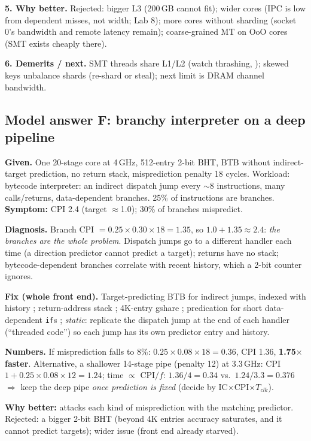 \textbf{5. Why better.} Rejected: bigger L3 (200\,GB cannot fit); wider cores (IPC is low from dependent misses, not width; Lab 8); more cores without sharding (socket 0's bandwidth and remote latency remain); coarse-grained MT on OoO cores (SMT exists cheaply there).

\textbf{6. Demerits / next.} SMT threads share L1/L2 (watch thrashing, ); skewed keys unbalance shards (re-shard or steal); next limit is DRAM channel bandwidth.

\subsection{Model answer F: branchy interpreter on a deep pipeline}\label{sec:modelF}
\textbf{Given.} One 20-stage core at 4\,GHz, 512-entry 2-bit BHT, BTB without indirect-target prediction, no return stack, misprediction penalty 18 cycles. Workload: bytecode interpreter: an indirect dispatch jump every $\sim$8 instructions, many calls/returns, data-dependent branches. 25\% of instructions are branches. \textbf{Symptom:} CPI 2.4 (target $\approx$1.0); 30\% of branches mispredict.

\textbf{Diagnosis.} Branch CPI $=0.25\times0.30\times18=1.35$, so $1.0+1.35\approx2.4$: \emph{the branches are the whole problem}. Dispatch jumps go to a different handler each time (a direction predictor cannot predict a target); returns have no stack; bytecode-dependent branches correlate with recent history, which a 2-bit counter ignores.

\textbf{Fix (whole front end).} Target-predicting BTB for indirect jumps, indexed with history\bs{} ; return-address stack ; 4K-entry gshare ; predication for short data-dependent \texttt{if}s ; \emph{static}: replicate the dispatch jump at the end of each handler (``threaded code''\bs) so each jump has its own predictor entry and history.

\textbf{Numbers.} If misprediction falls to 8\%: $0.25\times0.08\times18=0.36$, CPI 1.36, \textbf{1.75$\times$ faster}. Alternative, a shallower 14-stage pipe (penalty 12) at 3.3\,GHz: CPI $1+0.25\times0.08\times12=1.24$; time $\propto$ CPI$/f$: $1.36/4=0.34$ vs.\ $1.24/3.3=0.376$ $\Rightarrow$ keep the deep pipe \emph{once prediction is fixed} (decide by IC$\times$CPI$\times T_{clk}$).

\textbf{Why better:} attacks each kind of misprediction with the matching predictor. Rejected: a bigger 2-bit BHT (beyond 4K entries accuracy saturates, and it cannot predict targets); wider issue (front end already starved).

